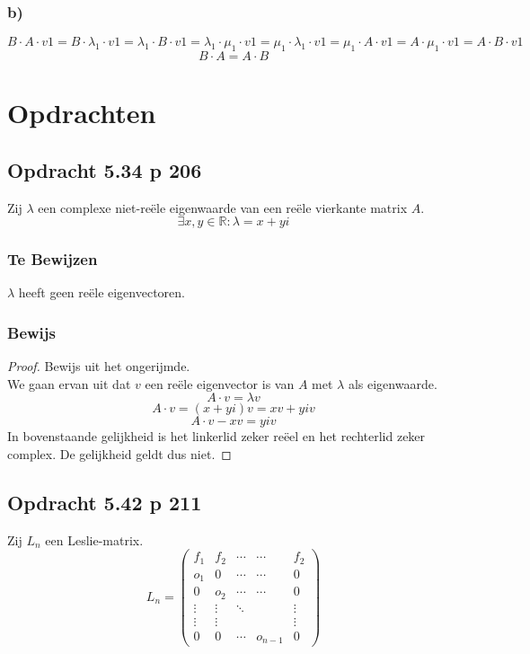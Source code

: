 \documentclass[lineaire_algebra_oplossingen.tex]{subfiles}
\begin{document}
\subsubsection*{b)}
\[
B\cdot A\cdot v1
= B\cdot \lambda_1\cdot v1
= \lambda_1\cdot B\cdot v1
= \lambda_1\cdot \mu_1\cdot v1
= \mu_1\cdot \lambda_1\cdot v1
= \mu_1\cdot A\cdot v1
= A\cdot \mu_1\cdot v1
= A\cdot B\cdot v1
\]
\[
B\cdot A = A\cdot B
\]


\section{Opdrachten}


\subsection{Opdracht 5.34 p 206}
\label{5.34}
Zij $\lambda$ een complexe niet-re\"ele eigenwaarde van een re\"ele vierkante matrix $A$.
\[
\exists x,y \in \mathbb{R}: \lambda = x +yi
\]

\subsubsection*{Te Bewijzen}
$\lambda$ heeft geen re\"ele eigenvectoren.

\subsubsection*{Bewijs}
\begin{proof}
Bewijs uit het ongerijmde.\\
We gaan ervan uit dat $v$ een re\"ele eigenvector is van $A$ met $\lambda$ als eigenwaarde.
\[
A\cdot v = \lambda v
\]
\[
A\cdot v = (x+yi) v= xv + yiv
\]
\[
A\cdot v - xv = yiv
\]
In bovenstaande gelijkheid is het linkerlid zeker re\"eel en het rechterlid zeker complex.
De gelijkheid geldt dus niet. 
\end{proof}


\subsection{Opdracht 5.42 p 211}
\label{5.42}
Zij $L_n$ een Leslie-matrix.
\[
L_n =
\begin{pmatrix}
f_1 & f_2 & \cdots & \cdots & f_2\\
o_1 & 0 & \cdots & \cdots & 0\\
0 & o_2 & \cdots & \cdots & 0\\
\vdots & \vdots & \ddots & & \vdots\\
\vdots & \vdots & & & \vdots\\
0 & 0 & \cdots & o_{n-1} & 0
\end{pmatrix}
\]
\end{document}
